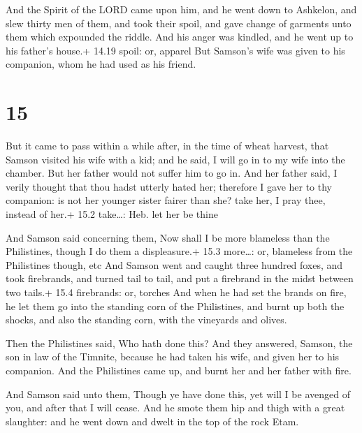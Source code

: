  And the Spirit of the LORD came upon him, and he went
down to Ashkelon, and slew thirty men of them, and took their spoil, and
gave change of garments unto them which expounded the riddle. And his
anger was kindled, and he went up to his father's house.+ 14.19 spoil:
or, apparel  But Samson's wife was given to his companion,
whom he had used as his friend.

\hypertarget{section-14}{%
\section{15}\label{section-14}}

 But it came to pass within a while after, in the time of
wheat harvest, that Samson visited his wife with a kid; and he said, I
will go in to my wife into the chamber. But her father would not suffer
him to go in.  And her father said, I verily thought that
thou hadst utterly hated her; therefore I gave her to thy companion: is
not her younger sister fairer than she? take her, I pray thee, instead
of her.+ 15.2 take\ldots: Heb. let her be thine

 And Samson said concerning them, Now shall I be more
blameless than the Philistines, though I do them a displeasure.+ 15.3
more\ldots: or, blameless from the Philistines though, etc 
And Samson went and caught three hundred foxes, and took firebrands, and
turned tail to tail, and put a firebrand in the midst between two
tails.+ 15.4 firebrands: or, torches  And when he had set
the brands on fire, he let them go into the standing corn of the
Philistines, and burnt up both the shocks, and also the standing corn,
with the vineyards and olives.

 Then the Philistines said, Who hath done this? And they
answered, Samson, the son in law of the Timnite, because he had taken
his wife, and given her to his companion. And the Philistines came up,
and burnt her and her father with fire.

 And Samson said unto them, Though ye have done this, yet
will I be avenged of you, and after that I will cease.  And
he smote them hip and thigh with a great slaughter: and he went down and
dwelt in the top of the rock Etam.

